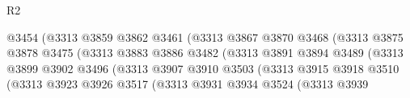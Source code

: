 \begin{lexlean}{R2}
\begin{coremodule}
                                            @3454
                                            (@3313
                                              @3859
                                              @3862
                                              @3461
                                              (@3313
                                                @3867
                                                @3870
                                                @3468
                                                (@3313
                                                  @3875
                                                  @3878
                                                  @3475
                                                  (@3313
                                                    @3883
                                                    @3886
                                                    @3482
                                                    (@3313
                                                      @3891
                                                      @3894
                                                      @3489
                                                      (@3313
                                                        @3899
                                                        @3902
                                                        @3496
                                                        (@3313
                                                          @3907
                                                          @3910
                                                          @3503
                                                          (@3313
                                                            @3915
                                                            @3918
                                                            @3510
                                                            (@3313
                                                              @3923
                                                              @3926
                                                              @3517
                                                              (@3313
                                                                @3931
                                                                @3934
                                                                @3524
                                                                (@3313
                                                                  @3939

\end{coremodule}
\end{lexlean}
